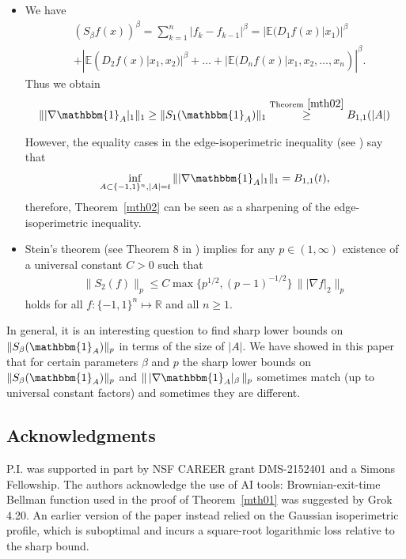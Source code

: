 \documentclass[11pt]{amsart}
\theoremstyle{definition}
\renewcommand{\1}{{\mathbbm{1}}}
\begin{document}
\begin{itemize}
The reader should compare (\ref{taliso}) with lower bounds for $\| S_{\beta} (\mathbbm{1}_{A}) \|_{p}$ obtained in Theorems~\ref{mth01}, \ref{mth02} and \ref{mth03}. 
\item[3.] We have 
\begin{align*}
    &(S_{\beta}f(x))^{\beta} = \sum_{k=1}^{n} |f_{k}-f_{k-1}|^{\beta}= |\mathbb{E} (D_{1}f(x)|x_{1})|^{\beta}\\
    &+|\mathbb{E} (D_{2}f(x)|x_{1}, x_{2})|^{\beta}+\ldots+|\mathbb{E} (D_{n}f(x)|x_{1}, x_{2}, \ldots, x_{n})|^{\beta}.
\end{align*}
Thus we obtain 
\begin{align*}
\| |\nabla \mathbbm{1}_{A}|_{1}\|_{1} \geq \| S_{1}(\mathbbm{1}_{A})\|_{1} \stackrel{\mathrm{Theorem~\ref{mth02}}}{\geq} B_{1,1}(|A|)
\end{align*}

However, the equality cases in the edge-isoperimetric inequality (see \cite{BIM}) say that 
$$
\inf_{A\subset  \{-1,1\}^{n}, |A|=t}\| |\nabla \mathbbm{1}_{A}|_{1}\|_{1} = B_{1,1}(t), 
$$
therefore, Theorem~\ref{mth02} can be seen as a sharpening of the edge-isoperimetric inequality. 
\item[4.] Stein's theorem (see Theorem 8 in \cite{Stein}) implies for any $p \in (1, \infty)$ existence of a universal constant $C>0$ such that 
\begin{align*}
    \| S_{2}(f)\|_{p} \leq C \max\{p^{1/2}, (p-1)^{-1/2}\} \, \| |\nabla f|_{2} \|_{p}
\end{align*}
holds for all $f : \{-1,1\}^{n} \mapsto \mathbb{R}$ and all $n \geq 1$. 
\end{itemize}


In general, it is an interesting question to find sharp lower bounds on $\| S_{\beta}({\mathbbm{1}}_{A})\|_{p}$ in terms of the size of $|A|$. We have showed in this paper that for certain parameters $\beta$ and $p$ the sharp lower bounds on $\| S_{\beta}(\mathbbm{1}_{A})\|_{p}$ and $\|\, |\nabla \mathbbm{1}_{A}|_{\beta} \,\|_{p}$ sometimes match (up to universal constant factors) and sometimes they are different. 

\subsection*{Acknowledgments}
P.I. was supported in part by NSF CAREER grant DMS-2152401 and a Simons Fellowship. The authors acknowledge the use of AI tools: Brownian-exit-time Bellman function used in the proof of Theorem~\ref{mth01} was suggested by Grok 4.20. An earlier version of the paper instead relied on the Gaussian isoperimetric profile, which is suboptimal and incurs a square-root logarithmic loss relative to the sharp bound.
\end{document}

